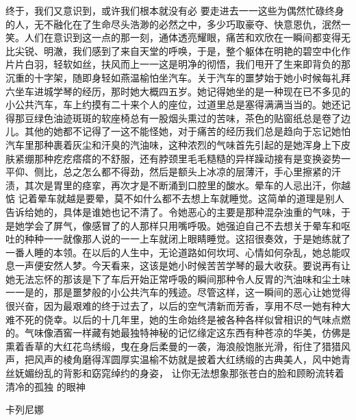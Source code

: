 \documentclass{article}
\begin{document}
终于，我们又意识到，或许我们根本就没有必
\newpage
要走进去一一这些为偶然忙碌终身的人，无不融化在了生命尽头浩渺的必然之中，多少巧取豪夺、快意恩仇，泯然一笑。人们在意识到这一点的那一刻，通体透亮耀眼，痛苦和欢欣在一瞬间都变得无比尖锐、明澈，我们感到了来自天堂的呼唤，于是，整个躯体在明艳的碧空中化作片片白羽，轻软如丝，扶风而上一一这是明净的彻悟，我们甩开了生来即背负的那沉重的十字架，随即身轻如燕温榆怕坐汽车。关于汽车的噩梦始于她小时候每礼拜六坐车进城学琴的经历，那时她大概四五岁。她记得她坐的是一种现在已不多见的小公共汽车，车上约摸有二十来个人的座位，过道里总是塞得满满当当的。她还记得那豆绿色油迹斑斑的软座椅总有一股烟头熏过的苦味，茶色的贴窗纸总是卷了边儿。其他的她都不记得了一这不能怪她，对于痛苦的经历我们总是趋向于忘记她怕汽车里那种裹着灰尘和汗臭的汽油味，这种浓烈的气味首先引起的是她浑身上下皮肤紧绷那种疙疙瘩瘩的不舒服，还有脖颈里毛毛糙糙的异样躁动接有是变换姿势一平仰、侧比，总之怎么都不得劲，然后是额头上冰凉的层薄汗，手心里擦紧的汗渍，其次是胃里的痉挛，再次才是不断涌到口腔里的酸水。晕车的人忌出汗，你越惦
\newpage
记着晕车就越是要晕，莫不如什么都不去想上车就睡觉。这简单的道理是别人告诉给她的，具体是谁她也记不清了。令她恶心的主要是那种混杂浊重的气味，于是她学会了屏气，像感冒了的人那样只用嘴呼吸。她强迫自己不去想关于晕车和呕吐的种种一一就像那人说的一一上车就闭上眼睛睡觉。这招很奏效，于是她练就了一番人睡的本领。在以后的人生中，无论道路如何坎坷、心情如何杂乱，她总能叹息一声便安然人梦。今天看来，这该是她小时候苦苦学琴的最大收获。要说再有让她无法忘怀的那该是下了车后开始正常呼吸的瞬间那种令人反胃的汽油味和尘土味一一是的，那是噩梦般的小公共汽车的残迹。尽管这样，这一瞬间的恶心让她觉得很兴奋，因为最艰难的终于过去了，以后的空气清新而芳香，享用不尽一她有种大难不死的侥幸。以后的十几年里，她的生命始终是被各种各样似曾相识的气味点燃的。气味像酒窖一样藏有她最独特神秘的记忆缘定这东西有种苍凉的华美，仿佛是熏着香草的大红花鸟绣缎，曳在身后柔曼的一袭，海浪般饱胀光滑，衔住了猎猎风声，把风声的棱角磨得浑圆厚实温榆不妨就是披着大红绣缎的古典美人，风中她青丝妩媚纷乱的背影和窈窕绰约的身姿，
\newpage
让你无法想象那张苍白的脸和顾盼流转着清冷的孤独
的眼神 


卡列尼娜 
\end{document}
